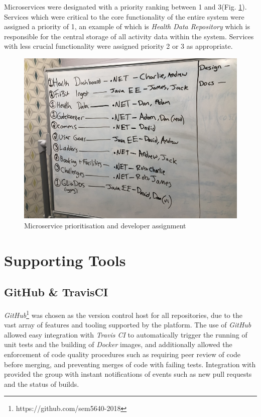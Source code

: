 Microservices were designated with a priority ranking between 1 and 3(Fig. \ref{fig:numbering_microservice_priority}).  Services which were critical to the core functionality of the entire system were assigned a priority of 1, an example of which is \textit{Health Data Repository} which is responsible for the central storage of all activity data within the system.  Services with less crucial functionality were assigned priority 2 or 3 as appropriate.

\begin{figure}[H]
    \centering
    \includegraphics[width=\textwidth]{Images/Numbering_Microservices.jpg}
    \caption{Microservice prioritisation and developer assignment}
    \label{fig:numbering_microservice_priority}
\end{figure}


\section{Supporting Tools}
\subsection{GitHub \& TravisCI}
\textit{GitHub}\footnote{https://github.com/sem5640-2018} was chosen as the version control host for all repositories, due to the vast array of features and tooling supported by the platform.  The use of \textit{GitHub} allowed easy integration with \textit{Travis CI} to automatically trigger the running of unit tests and the building of \textit{Docker} images, and additionally allowed the enforcement of code quality procedures such as requiring peer review of code before merging, and preventing merges of code with failing tests.  Integration with  provided the group with instant notifications of events such as new pull requests and the status of  builds.

